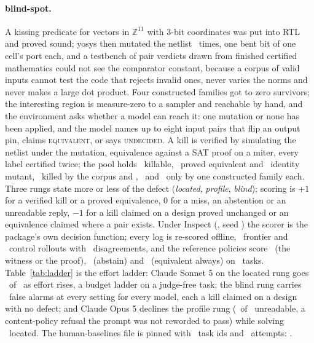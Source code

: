 \documentclass[11pt]{article}
\theoremstyle{definition}
\newcommand{\verdict}[1]{\textsc{#1}}
\begin{document}
\paragraph{blind-spot.} A kissing predicate for vectors in $\mathbb{Z}^{11}$ with 3-bit coordinates was put into RTL and proved sound; yosys then mutated the netlist \BsMutations\ times, one bent bit of one cell's port each, and a testbench of pair verdicts drawn from finished certified mathematics could not see the comparator constant, because a corpus of valid inputs cannot test the code that rejects invalid ones, never varies the norms and never makes a large dot product. Four constructed families got to zero survivors; the interesting region is measure-zero to a sampler and reachable by hand, and the environment asks whether a model can reach it: one mutation or none has been applied, and the model names up to eight input pairs that flip an output pin, claims \verdict{equivalent}, or says \verdict{undecided}. A kill is verified by simulating the netlist under the mutation, equivalence against a SAT proof on a miter, every label certified twice; the pool holds \BsKillable\ killable, \BsEquivalent\ proved equivalent and \BsIdentity\ identity mutant, \BsCovered\ killed by the corpus and \BsMintOnly, \BsOutboxOnly\ and \BsAlignedOnly\ only by one constructed family each. Three rungs state more or less of the defect (\emph{located}, \emph{profile}, \emph{blind}); scoring is $+1$ for a verified kill or a proved equivalence, $0$ for a miss, an abstention or an unreadable reply, $-1$ for a kill claimed on a design proved unchanged or an equivalence claimed where a pair exists. Under Inspect \cite{Inspect} (\BsInspect, seed \BsSeed) the scorer is the package's own decision function; every log is re-scored offline, \BsFrontierRollouts\ frontier and \BsControlRollouts\ control rollouts with \BsDisagreements\ disagreements, and the reference policies score \BsSatMean\ (the witness or the proof), \BsAbstainMean\ (abstain) and \BsNeverMean\ (equivalent always) on \BsControlN\ tasks. Table~\ref{tab:ladder} is the effort ladder: Claude Sonnet 5 on the located rung goes \BsSonnetLocated\ of \BsRungN\ as effort rises, a budget ladder on a judge-free task; the blind rung carries \BsBlindWrong\ false alarms at every setting for every model, each a kill claimed on a design with no defect; and Claude Opus 5 declines the profile rung (\BsOpusProfileUnreadable\ of \BsRungN\ unreadable, a content-policy refusal the prompt was not reworded to pass) while solving \BsOpusLocated\ located. The human-baselines file is pinned with \BsBaselineTasks\ task ids and \BsBaselineAttempts\ attempts: \BsBaselineStatus.
\end{document}
